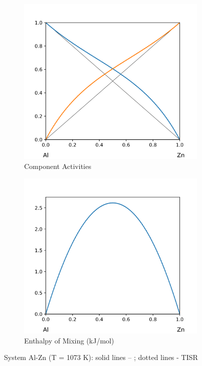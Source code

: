 \documentclass[12pt,abstract]{scrartcl}
\begin{document}
\begin{figure}
\centering
\begin{subfigure}{.5\textwidth}
  \centering
  \includegraphics[width=1\linewidth]{Al-Zn_Activity}
  \caption{Component Activities}
  \label{fig:sub1}
\end{subfigure}%
\begin{subfigure}{.5\textwidth}
  \centering
  \includegraphics[width=1\linewidth]{Al-Zn_Enthalpy}
  \caption{Enthalpy of Mixing (kJ/mol)}
  \label{fig:sub2}
\end{subfigure}
\caption{System Al-Zn (T = 1073 K): solid lines -- \cite{Al-Zn_Data}; dotted lines - TISR}
\label{fig:Al-Zn}
\end{figure}
\end{document}
